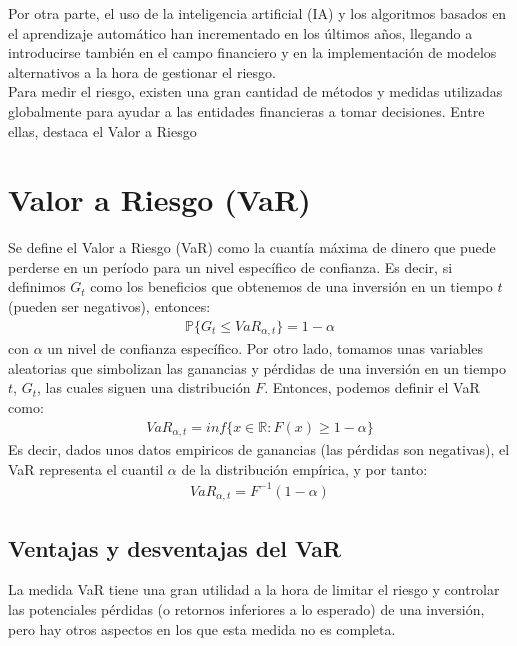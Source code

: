 \documentclass[11pt]{book}
\theoremstyle{plain} %
\theoremstyle{definition} %
\begin{document}
Por otra parte, el uso de la inteligencia artificial (IA) y los algoritmos basados 
en el aprendizaje automático han incrementado en los últimos años, llegando 
a introducirse también en el campo financiero y en la implementación de 
modelos alternativos a la hora de gestionar el riesgo. \\

Para medir el riesgo, existen una gran cantidad de métodos y medidas 
utilizadas globalmente para ayudar a las entidades financieras a tomar 
decisiones. Entre ellas, destaca el Valor a Riesgo 

\section{Valor a Riesgo (VaR)}
Se define el Valor a Riesgo (VaR) como la cuantía máxima de dinero que 
puede perderse en un período para un nivel específico de confianza. Es decir, 
si definimos $G_t$ como los beneficios que obtenemos de una inversión 
en un tiempo $t$ (pueden ser negativos), entonces:
\begin{align*}
     \mathbb{P}\{G_t \leq VaR_{\alpha, t}\} = 1-\alpha
\end{align*}
con $\alpha$ un nivel de confianza específico.
Por otro lado, tomamos unas variables aleatorias que simbolizan las 
ganancias y pérdidas de una inversión en un tiempo $t$, $G_t$, las cuales 
siguen una distribución $F$. Entonces, podemos definir el VaR como:
\begin{align*}
    VaR_{\alpha, t} = inf\{x\in \mathbb{R}:F(x)\geq 1-\alpha\}
\end{align*}
Es decir, dados unos datos empiricos de ganancias (las pérdidas son negativas), 
el VaR representa el cuantil $\alpha$ de la distribución empírica, y por tanto:
\begin{align*}
    VaR_{\alpha, t} = F^{-1}(1-\alpha)
\end{align*}

\subsection{Ventajas y desventajas del VaR}
La medida VaR tiene una gran utilidad a la hora de limitar el riesgo y 
controlar las potenciales pérdidas (o retornos inferiores a lo esperado) 
de una inversión, pero hay otros aspectos en los que esta medida no es 
completa.\\
\end{document}
